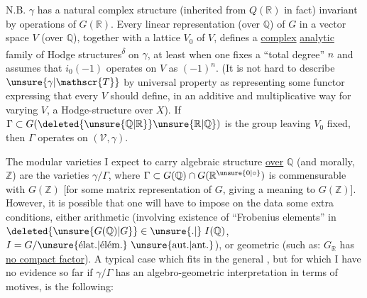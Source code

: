 N.B. $\gamma$ has a natural complex structure (inherited from  $Q(\mathbb{R})$ in fact) invariant by operations of $G(\mathbb{R})$. Every linear representation (over $\mathbb{Q}$) of $G$ in a vector space $V$ (over $\mathbb{Q}$), together with a lattice $V_0$ of $V$, defines a \uline{complex} \uline{analytic} family  of Hodge structures\textsuperscript{\ensuremath{\delta}} on $\gamma$, at least when one fixes a ``total degree'' $n$
and assumes that $i_0(-1)$ operates on $V$ as  $(-1)^n$. (It is not hard to describe $\unsure{\gamma|\mathscr{T}}$ by universal property as  representing some functor  expressing that every $V$  should define, in an additive and multiplicative way for varying $V$, a Hodge-structure  over $X$). If $\Gamma\subset G(\deleted{\unsure{\mathbb{Q}|\mathbb{R}}}\unsure{\mathbb{R}|\mathbb{Q}})$ is the group leaving $V_0$ fixed, then $\Gamma$ operates on $(\mathscr{V},\gamma)$.

The modular varieties I expect to carry algebraic structure \uline{over} $\mathbb{Q}$ (and morally, $\mathbb{Z}$) are the varieties $\boxed{\gamma/\Gamma}$, where $\Gamma\subset G(\mathbb{Q})\cap G(\mathbb{R}^{\unsure{0|\circ}})$  is commensurable with $G(\mathbb{Z})$ [for some matrix representation of $G$,  giving a meaning to $G(\mathbb{Z})$]. However, it is possible that one will have to impose on the data some extra conditions, either arithmetic (involving existence of ``Frobenius elements'' in $\deleted{\unsure{G(\mathbb{Q})|G}}\in\unsure{.|{}}\;I(\mathbb{Q})$, $I=G/\text{\unsure{élat.|élém.} \unsure{aut.|ant.}}$), or geometric  (such as: $G_{\mathbb{R}}$ has \uline{no compact factor}). A typical case which fits in the general  , but for which I have no evidence so far if $\gamma/\Gamma$ has
an algebro-geometric interpretation in terms of  motives, is the following:

